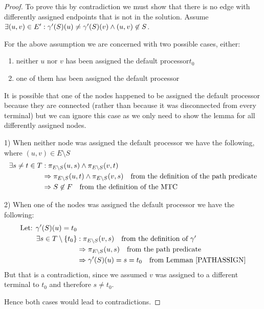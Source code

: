 \begin{proof}
To prove this by contradiction we must show that there is no edge with differently assigned endpoints that is not in the solution.
Assume $\exists (u,v) \in E' : \gamma'(S)(u) \neq \gamma'(S)(v) \wedge (u,v) \not\in S$.

For the above assumption we are concerned with two possible cases, either:
\begin{enumerate}
	\item neither $u$ nor $v$ has been assigned the default processor$t_0$
	\item one of them has been assigned the default processor
\end{enumerate}

\noindent It is possible that one of the nodes happened to be assigned the default processor because they are connected (rather than because it was disconnected from every terminal) but we can ignore this case as we only need to show the lemma for all differently assigned nodes.

1) When neither node was assigned the default processor we have the following, where $(u, v) \in E \setminus S$
\begin{align}
	\nonumber \exists s \neq t \in T  & : \pi_{E \setminus S}(u, s) \wedge \pi_{E \setminus S}(v, t) \\
	\nonumber & \Rightarrow \pi_{E \setminus S}(u, t) \wedge \pi_{E \setminus S}(v, s) \quad \mbox{from the definition of the path predicate}\\
	\nonumber & \Rightarrow S \not\in F \quad \mbox{from the definition of the MTC}
\end{align}

2) When one of the nodes was assigned the default processor we have the following:
\begin{align}
	\nonumber \mbox{Let: } \gamma'(S)(u) = t_0 & \\
	\nonumber \exists s \in T \setminus \{t_0\} & : \pi_{E \setminus S}(v, s) \quad \mbox{from the definition of $\gamma'$}\\
	\nonumber & \Rightarrow \pi_{E \setminus S}(u, s) \quad \mbox{from the path predicate}\\
	\nonumber & \Rightarrow \gamma'(S)(u) = s = t_0 \quad \mbox{from Lemman \ref{PATHASSIGN}}
\end{align}
But that is a contradiction, since we assumed $v$ was assigned to a different terminal to $t_0$ and therefore $s \neq t_0$.

Hence both cases would lead to contradictions.
\end{proof}

